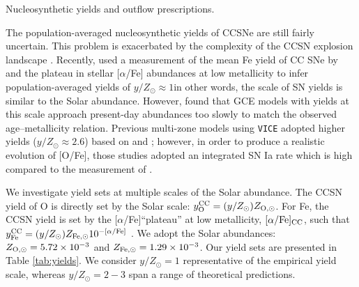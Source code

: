 \documentclass[twocolumn,twocolappendix,linenumbers]{aastex631}
\newcommand{\aFe}{[$\alpha$/Fe]\xspace}
\newcommand{\mathaFe}{[\alpha/{\rm Fe}]}
\newcommand{\yZ}[1]{$y/Z_\odot=#1$}
\begin{document}
\begin{table}
    \centering
    \caption{Nucleosynthetic yields and outflow prescriptions.}
    
    \label{tab:yields}
\end{table}

The population-averaged nucleosynthetic yields of CCSNe are still fairly uncertain. This problem is exacerbated by the complexity of the CCSN explosion landscape \citep{sukhbold_core-collapse_2016}. Recently, \citet{weinberg_scale_2024} used a measurement of the mean Fe yield of CC SNe by \citet{rodriguez_iron_2023} and the plateau in stellar \aFe abundances at low metallicity to infer population-averaged yields of $y/Z_\odot\approx1$\textemdash in other words, the scale of SN yields is similar to the Solar abundance. However, \citet{johnson_milky_2024} found that GCE models with yields at this scale approach present-day abundances too slowly to match the observed age--metallicity relation. Previous multi-zone models using {\tt VICE} \citep[e.g.,][]{johnson_stellar_2021,dubay_galactic_2024} adopted higher yields ($y/Z_\odot\approx2.6$) based on \citet{chieffi_explosive_2004} and \citet{limongi_nucleosynthesis_2006}; however, in order to produce a realistic evolution of [O/Fe], those studies adopted an integrated SN Ia rate which is high compared to the measurement of \citet{maoz_star_2017}.

We investigate yield sets at multiple scales of the Solar abundance. The CCSN yield of O is directly set by the Solar scale: $y_{\rm O}^{\rm CC}=(y/Z_\odot)Z_{\rm O,\odot}$. For Fe, the CCSN yield is set by the \aFe ``plateau'' at low metallicity, $\mathaFe_{\rm CC}$, such that $y_{\rm Fe}^{\rm CC}=(y/Z_\odot) Z_{\rm Fe,\odot} 10^{-\mathaFe}$ \citep[for further discussion on the empirical yield scale and the CCSN plateau, see][]{weinberg_scale_2024}. We adopt the \citet{asplund_chemical_2009} Solar abundances: $Z_{\rm O,\odot}=5.72\times10^{-3}$ and $Z_{\rm Fe,\odot}=1.29\times10^{-3}$. Our yield sets are presented in Table \ref{tab:yields}. We consider \yZ{1} representative of the empirical yield scale, whereas \yZ{2-3} span a range of theoretical predictions.
\end{document}
